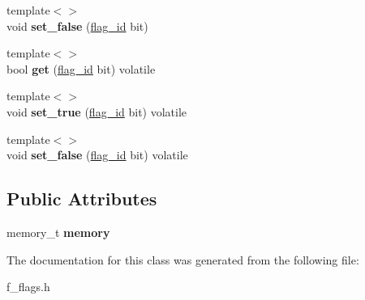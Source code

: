 \begin{DoxyCompactItemize}
\item 
\mbox{\label{classfsl_1_1lg_1_1flags_a1aa809458d12c11994a88c482f886652}} 
{\footnotesize template$<$$>$ }\\void {\bfseries set\+\_\+false} (\mbox{\hyperlink{classfsl_1_1lg_1_1range__int}{flag\+\_\+id}} bit)
\item 
\mbox{\label{classfsl_1_1lg_1_1flags_ab0dd0433d42e765a45d669067e8aec04}} 
{\footnotesize template$<$$>$ }\\bool {\bfseries get} (\mbox{\hyperlink{classfsl_1_1lg_1_1range__int}{flag\+\_\+id}} bit) volatile
\item 
\mbox{\label{classfsl_1_1lg_1_1flags_a7e8aab694d2ead2997a1941c03a7103b}} 
{\footnotesize template$<$$>$ }\\void {\bfseries set\+\_\+true} (\mbox{\hyperlink{classfsl_1_1lg_1_1range__int}{flag\+\_\+id}} bit) volatile
\item 
\mbox{\label{classfsl_1_1lg_1_1flags_aef070b797daad582aa247d179fa49ff1}} 
{\footnotesize template$<$$>$ }\\void {\bfseries set\+\_\+false} (\mbox{\hyperlink{classfsl_1_1lg_1_1range__int}{flag\+\_\+id}} bit) volatile
\end{DoxyCompactItemize}
\subsection*{Public Attributes}
\begin{DoxyCompactItemize}
\item 
\mbox{\label{classfsl_1_1lg_1_1flags_ac01124c785ed1754a118498d3597a2f1}} 
memory\+\_\+t {\bfseries memory}
\end{DoxyCompactItemize}


The documentation for this class was generated from the following file\+:\begin{DoxyCompactItemize}
\item 
f\+\_\+flags.\+h\end{DoxyCompactItemize}
